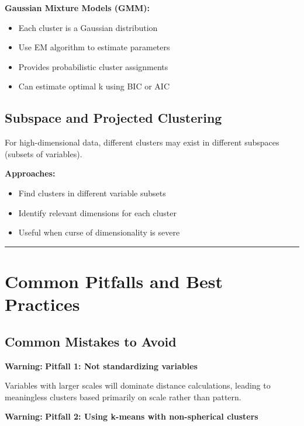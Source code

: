 \documentclass[
]{article}
\begin{document}
\textbf{Gaussian Mixture Models (GMM):}

\begin{itemize}
\item
  Each cluster is a Gaussian distribution
\item
  Use EM algorithm to estimate parameters
\item
  Provides probabilistic cluster assignments
\item
  Can estimate optimal k using BIC or AIC
\end{itemize}

\textbf{ }

\subsection{Subspace and Projected Clustering}

For high-dimensional data, different clusters may exist in different
subspaces (subsets of variables).

\textbf{Approaches:}

\begin{itemize}
\item
  Find clusters in different variable subsets
\item
  Identify relevant dimensions for each cluster
\item
  Useful when curse of dimensionality is severe
\end{itemize}

\begin{center}\rule{0.5\linewidth}{0.5pt}\end{center}

\textbf{ }

\section{Common Pitfalls and Best Practices}

\textbf{ }

\subsection{Common Mistakes to Avoid}

\textbf{Warning: } \textbf{Pitfall 1: Not standardizing variables}

Variables with larger scales will dominate distance calculations,
leading to meaningless clusters based primarily on scale rather than
pattern.

\textbf{Warning: } \textbf{Pitfall 2: Using k-means with non-spherical
clusters}
\end{document}
